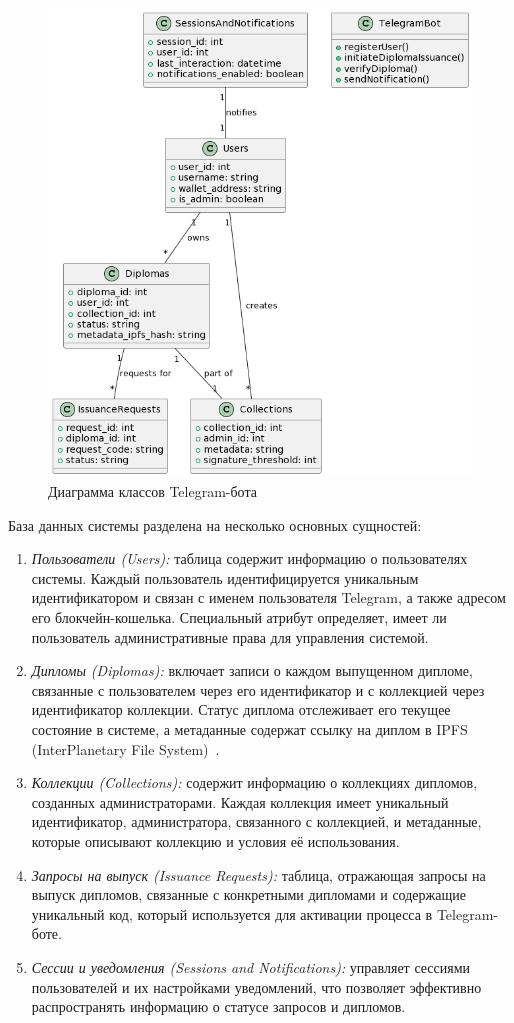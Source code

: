\begin{figure}[H]
	\centering
	\includegraphics[width=.9\textwidth]{images/tg_dc.png}
	\parskip=6pt
	\caption{Диаграмма классов Telegram-бота}
	\label{fig:tg_dc}
\end{figure}

База данных системы разделена на несколько основных сущностей:

\begin{enumerate}
    \item \textit{Пользователи (Users):} таблица содержит информацию о пользователях системы. Каждый пользователь идентифицируется уникальным идентификатором и связан с именем пользователя Telegram, а также адресом его блокчейн-кошелька. Специальный атрибут определяет, имеет ли пользователь административные права для управления системой.
    \item \textit{Дипломы (Diplomas):} включает записи о каждом выпущенном дипломе, связанные с пользователем через его идентификатор и с коллекцией через идентификатор коллекции. Статус диплома отслеживает его текущее состояние в системе, а метаданные содержат ссылку на диплом в IPFS (InterPlanetary File System)~\cite{bib:ipfs_is}.
    \item \textit{Коллекции (Collections):} содержит информацию о коллекциях дипломов, созданных администраторами. Каждая коллекция имеет уникальный идентификатор, администратора, связанного с коллекцией, и метаданные, которые описывают коллекцию и условия её использования.
    \item \textit{Запросы на выпуск (Issuance Requests):} таблица, отражающая запросы на выпуск дипломов, связанные с конкретными дипломами и содержащие уникальный код, который используется для активации процесса в Telegram-боте.
    \item \textit{Сессии и уведомления (Sessions and Notifications):} управляет сессиями пользователей и их настройками уведомлений, что позволяет эффективно распространять информацию о статусе запросов и дипломов.
\end{enumerate}


